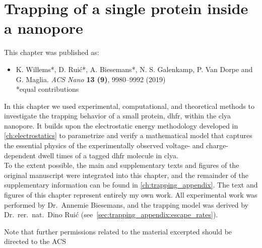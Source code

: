 %
\chapter{Trapping of a single protein inside a nanopore}
%
\label{ch:trapping}
%
%
%
%

%
%
\begin{shaded}
This chapter was published as:
%
\begin{itemize}
  \item K. Willems*, D. Rui\'{c}*, A. Biesemans*, N. S. Galenkamp, P. Van Dorpe and G. Maglia.
        \textit{ACS Nano} \textbf{13 (9)}, 9980--9992 (2019) %
        \\
        *equal contributions
\end{itemize}
% 
\newpage
\end{shaded}
%
%

\glsresetall
%

In this chapter we used experimental, computational, and theoretical methods to investigate the trapping
behavior of a small protein, \gls{dhfr}, within the \gls{clya} nanopore. It builds upon the electrostatic
energy methodology developed in \cref{ch:electrostatics} to parametrize and verify a mathematical model that
captures the essential physics of the experimentally observed voltage- and charge-dependent dwell times of a
tagged \gls{dhfr} molecule in \gls{clya}. \\
%

%
To the extent possible, the main and supplementary texts and figures of the original manuscript were
integrated into this chapter, and the remainder of the supplementary information can be found in
\cref{ch:trapping_appendix}. The text and figures of this chapter represent entirely my own work. All
experimental work was performed by Dr.~Annemie Biesemans, and the trapping model was derived by
Dr.~rer.~nat.~Dino Rui\'{c} (see~\cref{sec:trapping_appendix:escape_rates}).
%

%
%

%
Note that further permissions related to the material excerpted should be directed to the ACS
%
%
%




